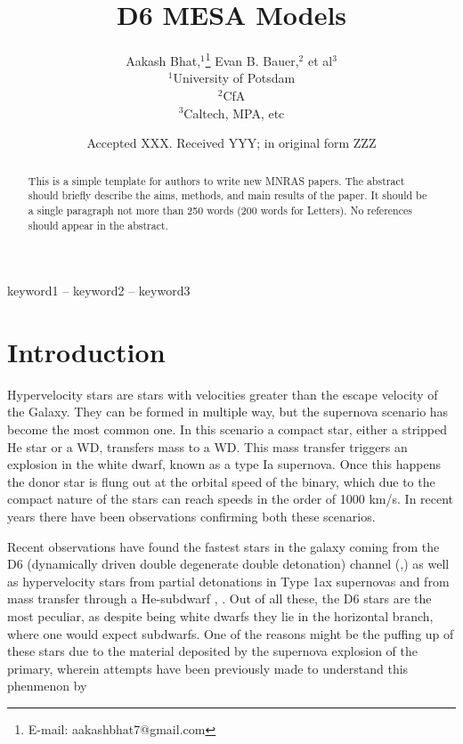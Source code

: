 \documentclass[fleqn,usenatbib]{mnras}
\title[D6 MESA Models 2]{D6 MESA Models}
\author[Bhat et al.]{
Aakash Bhat,$^{1}$\thanks{E-mail: aakashbhat7@gmail.com}
Evan B. Bauer,$^{2}$
et al$^{3}$
\\
$^{1}$University of Potsdam\\
$^{2}$CfA\\
$^{3}$Caltech, MPA, etc
}
\date{Accepted XXX. Received YYY; in original form ZZZ}
\begin{document}
\label{firstpage}
\pagerange{\pageref{firstpage}--\pageref{lastpage}}
\maketitle

\begin{abstract}
This is a simple template for authors to write new MNRAS papers.
The abstract should briefly describe the aims, methods, and main results of the paper.
It should be a single paragraph not more than 250 words (200 words for Letters).
No references should appear in the abstract.
\end{abstract}

\begin{keywords}
keyword1 -- keyword2 -- keyword3
\end{keywords}



\section{Introduction}

Hypervelocity stars are stars with velocities greater than the escape velocity of the Galaxy. They can be formed in multiple way, but the supernova scenario has become the most common one. In this scenario a compact star, either a stripped He star or a WD, transfers mass to a WD. This mass transfer triggers an explosion in the white dwarf, known as a type Ia supernova. Once this happens the donor star is flung out at the orbital speed of the binary, which due to the compact nature of the stars can reach speeds in the order of 1000 km/s. In recent years there have been observations confirming both these scenarios. 

Recent observations have found the fastest stars in the galaxy coming from the D6 (dynamically driven double degenerate double detonation) channel (\cite{2018ApJ...865...15S},\cite{2023arXiv230603914E}) as well as hypervelocity stars from partial detonations in Type 1ax supernovas \cite{2019MNRAS.489.1489R} and from mass transfer through a He-subdwarf \cite{2005A&A...444L..61H}, \cite{2015Sci...347.1126G}. Out of all these, the D6 stars are the most peculiar, as despite being white dwarfs they lie in the horizontal branch, where one would expect subdwarfs. One of the reasons might be the puffing up of these stars due to the material deposited by the supernova explosion of the primary, wherein attempts have been previously made to understand this phenmenon by \cite{}
\end{document}
